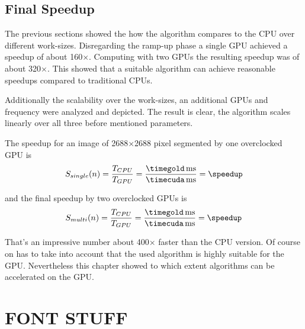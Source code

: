 

\section{Final Speedup} %
\label{sec:final_speedup}
The previous sections showed the how the algorithm compares to the \gls{CPU} over
different work-sizes. Disregarding the ramp-up phase a single \gls{GPU} achieved
a speedup of about 160$\times$. Computing with two \glspl{GPU} the resulting 
speedup was of about 320$\times$. This showed that a suitable algorithm can 
achieve reasonable speedups compared to traditional \glspl{CPU}.

Additionally the scalability over the work-sizes, an additional \glspl{GPU} and
frequency were analyzed and depicted. The result is clear, the algorithm scales
linearly over all three before mentioned parameters. 

\fpDiv{\speedup}{\timegold}{\timecuda}

The speedup for an image of 2688$\times$2688 pixel segmented by one
overclocked \gls{GPU} is 
\begin{equation}\label{eq:final_speedup_single}
 S_{single}(n) = \frac{T_{CPU}}{T_{GPU}} = \frac{\unit[\timegold]{ms}}{\unit[\timecuda]{ms}} = \speedup
\end{equation}

\fpDiv{\speedup}{\timegold}{\timecuda}

and the final speedup by two overclocked \glspl{GPU} is
\begin{equation}\label{eq:final_speedup_multi}
 S_{multi}(n) = \frac{T_{CPU}}{T_{GPU}} = \frac{\unit[\timegold]{ms}}{\unit[\timecuda]{ms}} = \speedup
\end{equation}

That's an impressive number about 400$\times$ faster than the \gls{CPU} version. 
Of course on has to take into account that the used algorithm is highly suitable
for the \gls{GPU}. Nevertheless this chapter showed to which extent algorithms 
can be accelerated on the \gls{GPU}.



\chapter{FONT STUFF}

